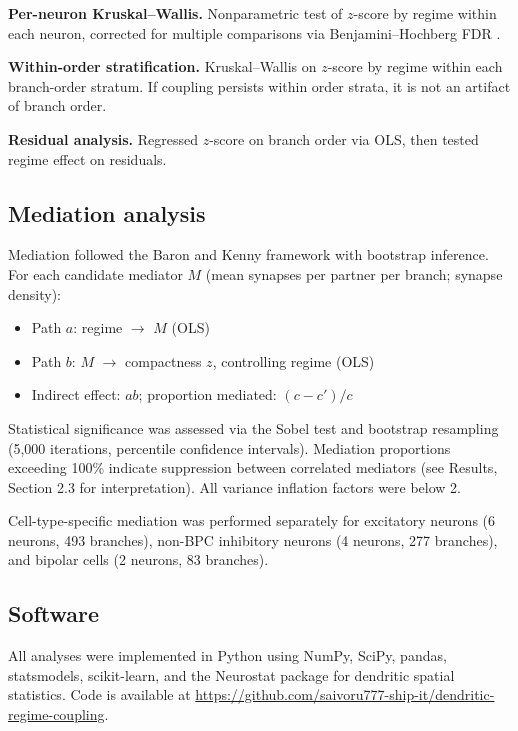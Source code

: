 \documentclass[11pt]{article}
\begin{document}
\textbf{Per-neuron Kruskal--Wallis.} Nonparametric test of $z$-score by regime within each neuron, corrected for multiple comparisons via Benjamini--Hochberg FDR \citep{benjamini1995}.

\textbf{Within-order stratification.} Kruskal--Wallis on $z$-score by regime within each branch-order stratum. If coupling persists within order strata, it is not an artifact of branch order.

\textbf{Residual analysis.} Regressed $z$-score on branch order via OLS, then tested regime effect on residuals.

\subsection{Mediation analysis}

Mediation followed the Baron and Kenny framework \citep{baron1986} with bootstrap inference. For each candidate mediator $M$ (mean synapses per partner per branch; synapse density):
\begin{itemize}
    \item Path $a$: regime $\to$ $M$ (OLS)
    \item Path $b$: $M$ $\to$ compactness $z$, controlling regime (OLS)
    \item Indirect effect: $ab$; proportion mediated: $(c - c')/c$
\end{itemize}
Statistical significance was assessed via the Sobel test \citep{sobel1982} and bootstrap resampling (5,000 iterations, percentile confidence intervals). Mediation proportions exceeding 100\% indicate suppression between correlated mediators (see Results, Section 2.3 for interpretation). All variance inflation factors were below 2.

Cell-type-specific mediation was performed separately for excitatory neurons (6 neurons, 493 branches), non-BPC inhibitory neurons (4 neurons, 277 branches), and bipolar cells (2 neurons, 83 branches).

\subsection{Software}

All analyses were implemented in Python using NumPy, SciPy, pandas, statsmodels, scikit-learn, and the Neurostat package for dendritic spatial statistics. Code is available at \url{https://github.com/saivoru777-ship-it/dendritic-regime-coupling}.
\end{document}
